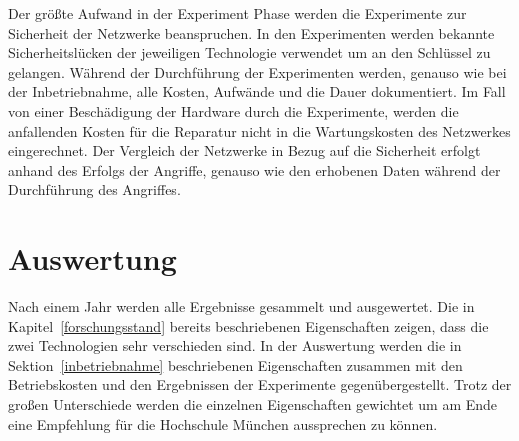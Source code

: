 Der größte Aufwand in der Experiment Phase werden die Experimente zur Sicherheit der Netzwerke beanspruchen.
In den Experimenten werden bekannte Sicherheitslücken der jeweiligen Technologie verwendet um an den Schlüssel zu gelangen.
Während der Durchführung der Experimenten werden, genauso wie bei der Inbetriebnahme, alle Kosten, Aufwände und die Dauer dokumentiert.
Im Fall von einer Beschädigung der Hardware durch die Experimente, werden die anfallenden Kosten für die Reparatur nicht in die Wartungskosten des Netzwerkes eingerechnet.
Der Vergleich der Netzwerke in Bezug auf die Sicherheit erfolgt anhand des Erfolgs der Angriffe, genauso wie den erhobenen Daten während der Durchführung des Angriffes.

\section{Auswertung}

Nach einem Jahr werden alle Ergebnisse gesammelt und ausgewertet.
Die in Kapitel~\ref{forschungsstand} bereits beschriebenen Eigenschaften zeigen, dass die zwei Technologien sehr verschieden sind.
In der Auswertung werden die in Sektion~\ref{inbetriebnahme} beschriebenen Eigenschaften zusammen mit den Betriebskosten und den Ergebnissen der Experimente gegenübergestellt.
Trotz der großen Unterschiede werden die einzelnen Eigenschaften gewichtet um am Ende eine Empfehlung für die Hochschule München aussprechen zu können.

